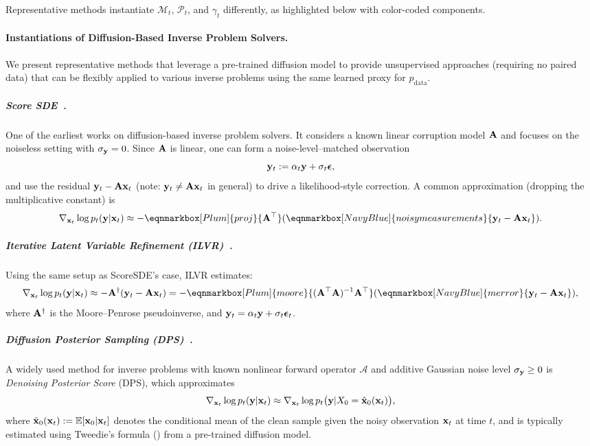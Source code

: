 Representative methods instantiate $\mathcal{M}_t$, $\mathcal{P}_t$, and $\gamma_t$ differently, as highlighted below with color-coded components.

\paragraph{Instantiations of Diffusion-Based Inverse Problem Solvers.}
We present representative methods that leverage a pre-trained diffusion model to provide unsupervised approaches (requiring no paired data) that can be flexibly applied to various inverse problems using the same learned proxy for $ p_{\mathrm{data}} $.


\subparagraph{Score SDE~\citep{song2020score}.} One of the earliest works on diffusion-based inverse problem solvers. It considers a known linear corruption model ${\mathbf{A}}$ and focuses on the noiseless setting with $\sigma_{{\mathbf{y}}} = 0$. Since ${\mathbf{A}}$ is linear, one can form a noise-level–matched observation
\[
{\mathbf{y}}_t := \alpha_t {\mathbf{y}} + \sigma_t \bm{\epsilon},
\]
and use the residual ${\mathbf{y}}_t - {\mathbf{A}} {\mathbf{x}}_t$ (note: ${\mathbf{y}}_t \neq {\mathbf{A}}{\mathbf{x}}_t$ in general) to drive a likelihood-style correction. A common approximation (dropping the multiplicative constant) is
\begin{align*}
    \nabla_{\rvx_t} \log p_t(\rvy|\rvx_t) \approx - \eqnmarkbox[Plum]{proj}{\rmA^\top} (\eqnmarkbox[NavyBlue]{noisymeasurements}{\rvy_t - \rmA \rvx_t}).
\end{align*}

\subparagraph{Iterative Latent Variable Refinement (ILVR)~\citep{choi2021ilvr}.} Using the same setup as ScoreSDE's case, ILVR estimates:
\begin{align*}
    \nabla_{\rvx_t} \log p_t(\rvy| \rvx_t) \approx -\rmA^\dagger(\rvy_t - \rmA\rvx_t) = -\eqnmarkbox[Plum]{moore}{(\rmA^\top \rmA)^{-1} \rmA^\top} (\eqnmarkbox[NavyBlue]{merror}{\rvy_t - \rmA\rvx_t}),
\end{align*}
where ${\mathbf{A}}^\dagger$ is the Moore–Penrose pseudoinverse, and ${\mathbf{y}}_t = \alpha_t{\mathbf{y}} + \sigma_t \bm{\epsilon}_t$.
\subparagraph{Diffusion Posterior Sampling (DPS)~\citep{chung2022diffusion}.} A widely used method for inverse problems with known nonlinear forward operator $\mathcal{A}$ and additive Gaussian noise level $\sigma_{{\mathbf{y}}} \ge 0$ is \emph{Denoising Posterior Score} (DPS), which approximates
\begin{align}\label{eq:dps-score}
  \nabla_{{\mathbf{x}}_t} \log p_t({\mathbf{y}}|{\mathbf{x}}_t)
   \approx 
  \nabla_{{\mathbf{x}}_t} \log p_t\bigl({\mathbf{y}}|X_0 = \hat{{\mathbf{x}}}_0({\mathbf{x}}_t)\bigr),
\end{align}
where $\hat{{\mathbf{x}}}_0({\mathbf{x}}_t) := \mathbb{E}[{\mathbf{x}}_0|{\mathbf{x}}_t]$ denotes the conditional mean of the clean sample given the noisy observation ${\mathbf{x}}_t$ at time $t$, and is typically estimated using Tweedie’s formula () from a pre-trained diffusion model. 

